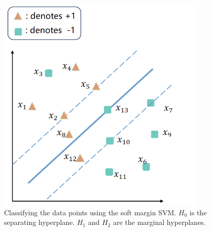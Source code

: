 \documentclass[11pt,letter,notitlepage]{article}
\begin{document}
\begin{figure}[H]
  \centering
  \includegraphics[width=10cm]{Figures/2024_fall_svm.png}
  \caption{Classifying the data points using the soft margin SVM. $H_0$ is the separating hyperplane. $H_1$ and $H_2$ are the marginal hyperplanes.}
  \label{svm}
\end{figure}
\begin{solution}

\end{solution}
\end{document}
